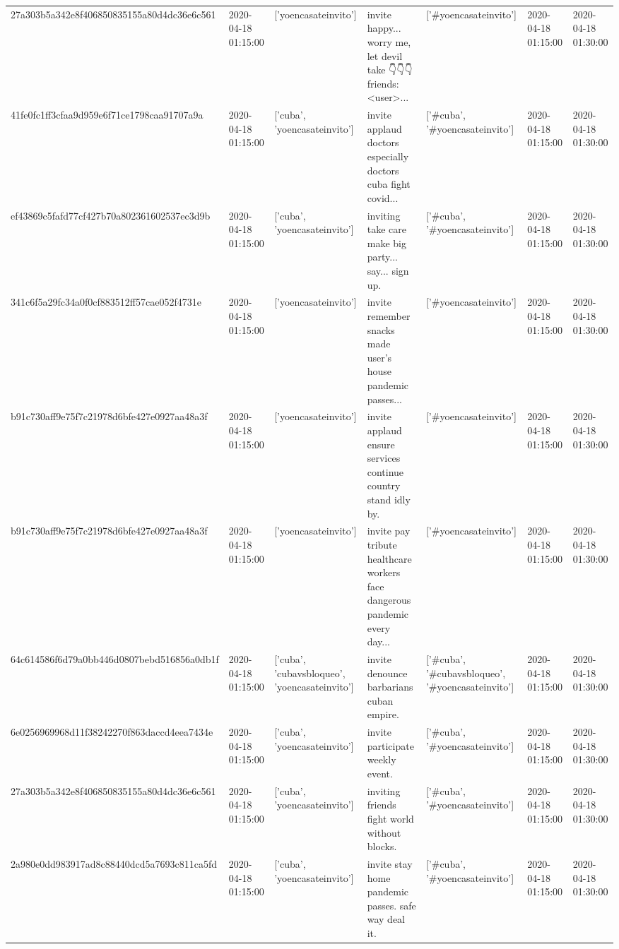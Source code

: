 \begin{tabular}{lllllll}
27a303b5a342e8f406850835155a80d4dc36e6c561 & 2020-04-18 01:15:00 & ['yoencasateinvito'] & invite happy... worry me, let devil take 👇👇👇 friends: <user>... & ['#yoencasateinvito'] & 2020-04-18 01:15:00 & 2020-04-18 01:30:00 \\
41fe0fc1ff3cfaa9d959e6f71ce1798caa91707a9a & 2020-04-18 01:15:00 & ['cuba', 'yoencasateinvito'] & invite applaud 👏👏👏 doctors ️ especially doctors cuba fight covid... & ['#cuba', '#yoencasateinvito'] & 2020-04-18 01:15:00 & 2020-04-18 01:30:00 \\
ef43869c5fafd77cf427b70a802361602537ec3d9b & 2020-04-18 01:15:00 & ['cuba', 'yoencasateinvito'] & inviting take care make big party... say... sign up. & ['#cuba', '#yoencasateinvito'] & 2020-04-18 01:15:00 & 2020-04-18 01:30:00 \\
341c6f5a29fc34a0f0cf883512ff57cae052f4731e & 2020-04-18 01:15:00 & ['yoencasateinvito'] & invite remember snacks made user's house pandemic passes... & ['#yoencasateinvito'] & 2020-04-18 01:15:00 & 2020-04-18 01:30:00 \\
b91c730aff9e75f7c21978d6bfe427e0927aa48a3f & 2020-04-18 01:15:00 & ['yoencasateinvito'] & invite applaud ensure services continue country stand idly by. & ['#yoencasateinvito'] & 2020-04-18 01:15:00 & 2020-04-18 01:30:00 \\
b91c730aff9e75f7c21978d6bfe427e0927aa48a3f & 2020-04-18 01:15:00 & ['yoencasateinvito'] & invite pay tribute healthcare workers face dangerous pandemic every day... & ['#yoencasateinvito'] & 2020-04-18 01:15:00 & 2020-04-18 01:30:00 \\
64c614586f6d79a0bb446d0807bebd516856a0db1f & 2020-04-18 01:15:00 & ['cuba', 'cubavsbloqueo', 'yoencasateinvito'] & invite denounce barbarians cuban empire. & ['#cuba', '#cubavsbloqueo', '#yoencasateinvito'] & 2020-04-18 01:15:00 & 2020-04-18 01:30:00 \\
6e0256969968d11f38242270f863daccd4eea7434e & 2020-04-18 01:15:00 & ['cuba', 'yoencasateinvito'] & invite participate weekly event. & ['#cuba', '#yoencasateinvito'] & 2020-04-18 01:15:00 & 2020-04-18 01:30:00 \\
27a303b5a342e8f406850835155a80d4dc36e6c561 & 2020-04-18 01:15:00 & ['cuba', 'yoencasateinvito'] & inviting friends fight world without blocks. & ['#cuba', '#yoencasateinvito'] & 2020-04-18 01:15:00 & 2020-04-18 01:30:00 \\
2a980e0dd983917ad8c88440dcd5a7693c811ca5fd & 2020-04-18 01:15:00 & ['cuba', 'yoencasateinvito'] & invite stay home pandemic passes. safe way deal it. & ['#cuba', '#yoencasateinvito'] & 2020-04-18 01:15:00 & 2020-04-18 01:30:00 \\

\end{tabular}
